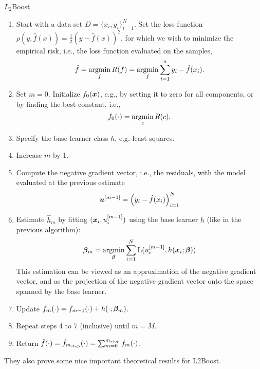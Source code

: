 \begin{algorithm}
\caption{$L_2$Boost}
\label{algo:L2}
\begin{enumerate}
    \item Start with a data set $D=\{x_i, y_i\}_{i=1}^N$. Set the loss function $\rho(y,\hat{f}(x))=\frac{1}{2}(y-\hat{f}(x))^2$, for which we wish to
        minimize the empirical risk, i.e., the loss function evaluated on the samples,
        \begin{equation}
            \hat{f}=\operatorname*{argmin}_{f}R(f)=\operatorname*{argmin}_{f}\sum_{i=1}^n y_i-\hat{f}(x_i).
        \end{equation}
    \item Set $m=0$. Initialize $f_0(\bm{x})$, e.g., by setting it to zero for all components, or by finding the best constant, i.e.,
        \begin{equation}
            f_0(\cdot)=\operatorname*{argmin}_c R(c).
        \end{equation}
    \item Specify the base learner class $h$, e.g. least squares.
    \item Increase $m$ by 1.
    \item Compute the negative gradient vector, i.e., the residuals, with the model evaluated at the previous estimate
        \begin{equation}
            \bm{u}^{[m-1]}=\left(y_i-\hat{f}(x_i)\right)_{i=1}^N
        \end{equation}
    \item Estimate $\hat{h}_m$ by fitting $(\bm{x}_i,u_i^{[m-1]})$ using the base learner $h$ (like in the previous algorithm):
        \begin{equation*}
            \boldsymbol{\beta}_m=\operatorname*{argmin}_{\boldsymbol{\beta}}\sum_{i=1}^N\operatorname{L}(u_i^{[m-1]},h(\bm{x}_i;\boldsymbol{\beta}))
        \end{equation*}
        This estimation can be viewed as an approximation of the negative gradient vector, and as the projection of the negative gradient vector onto the space spanned by the base learner.
    \item Update $f_m(\cdot)=f_{m-1}(\cdot)+h(\cdot;\boldsymbol{\beta}_m)$.
    \item Repeat steps 4 to 7 (inclusive) until $m=M$.
    \item Return $\hat{f}(\cdot)=\hat{f}_{m_{\text{stop}}}(\cdot)=\sum_{m=0}^{m_{\text{stop}}}f_m(\cdot)$.
\end{enumerate}
\end{algorithm}
They also prove some nice important theoretical results for L2Boost.
